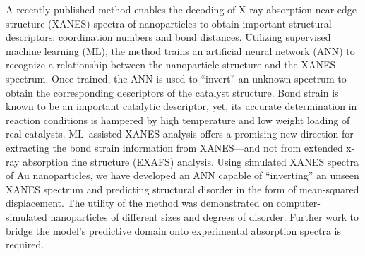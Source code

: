 


A recently published method \cite{Timoshenko2017} enables the decoding of X-ray absorption near edge structure (XANES) spectra of nanoparticles to obtain important structural descriptors: coordination numbers and bond distances. Utilizing supervised machine learning (ML), the method trains an artificial neural network (ANN) to recognize a relationship between the nanoparticle structure and the XANES spectrum. Once trained, the ANN is used to ``invert'' an unknown spectrum to obtain the corresponding descriptors of the catalyst structure. Bond strain is known to be an important catalytic descriptor, yet, its accurate determination in reaction conditions is hampered by high temperature and low weight loading of real catalysts. ML–assisted XANES analysis offers a promising new direction for extracting the bond strain information from XANES---and not from extended x-ray absorption fine structure (EXAFS) analysis. Using simulated XANES spectra of Au nanoparticles, we have developed an ANN capable of ``inverting'' an unseen XANES spectrum and predicting structural disorder in the form of mean-squared displacement. The utility of the method was demonstrated on computer-simulated nanoparticles of different sizes and degrees of disorder. Further work to bridge the model's predictive domain onto experimental absorption spectra is required.


